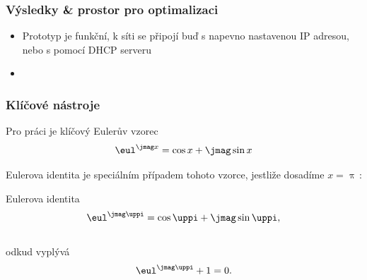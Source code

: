 \documentclass[%
  12pt,       				%
	t,                  %
	aspectratio=1610,   %
	unicode,						%
]{beamer}				    	%
\begin{document}
\begin{frame}
	\frametitle{Výsledky \& prostor pro optimalizaci}
	\begin{itemize}
		\item Prototyp je funkční, k síti se připojí buď s napevno nastavenou IP adresou, nebo s pomocí DHCP serveru
		\item 
	\end{itemize}
\end{frame}
\begin{frame} 
	\frametitle{Klíčové nástroje}

	\begin{alertblock}{Pro práci je klíčový Eulerův vzorec}
		$$\eul^{\jmag x}=\cos x + \jmag\sin x$$
	\end{alertblock}

	\vspace{4ex}
	Eulerova identita je speciálním případem tohoto vzorce, jestliže dosadíme $x=\uppi$\,:

	\begin{block}{Eulerova identita}
		$$\eul^{\jmag \uppi}=\cos \uppi + \jmag\sin \uppi,$$\\
		odkud vyplývá
		$$\eul^{\jmag \uppi}+1=0.$$
	\end{block}
\end{frame} 
\end{document}
